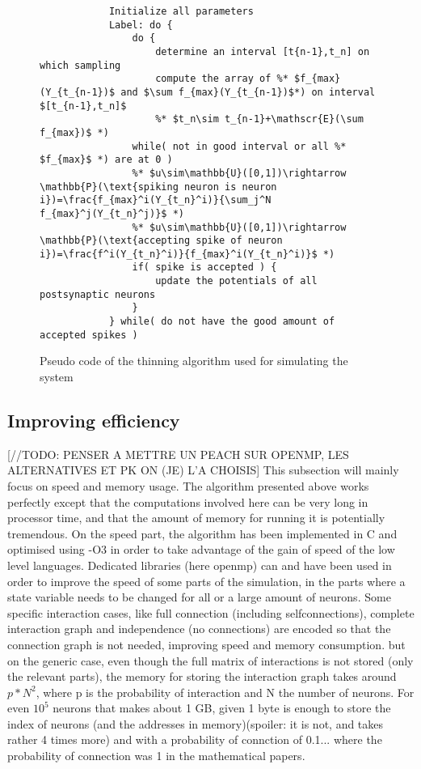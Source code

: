 	\begin{figure}
		\begin{lstlisting}
			Initialize all parameters
			Label: do {
				do {
					determine an interval [t{n-1},t_n] on which sampling
					compute the array of %* $f_{max}(Y_{t_{n-1})$ and $\sum f_{max}(Y_{t_{n-1})$*) on interval $[t_{n-1},t_n]$
					%* $t_n\sim t_{n-1}+\mathscr{E}(\sum f_{max})$ *)
				while( not in good interval or all %* $f_{max}$ *) are at 0 )
				%* $u\sim\mathbb{U}([0,1])\rightarrow \mathbb{P}(\text{spiking neuron is neuron i})=\frac{f_{max}^i(Y_{t_n}^i)}{\sum_j^N f_{max}^j(Y_{t_n}^j)}$ *)
				%* $u\sim\mathbb{U}([0,1])\rightarrow \mathbb{P}(\text{accepting spike of neuron i})=\frac{f^i(Y_{t_n}^i)}{f_{max}^i(Y_{t_n}^i)}$ *)
				if( spike is accepted ) {
					update the potentials of all postsynaptic neurons
				}
			} while( do not have the good amount of accepted spikes )
		\end{lstlisting}
		\caption{Pseudo code of the thinning algorithm used for simulating the system}
		\label{alg:pseudo-code}
	\end{figure}

\subsection{Improving efficiency}
	[//TODO: PENSER A METTRE UN PEACH SUR OPENMP, LES ALTERNATIVES ET PK ON (JE) L'A CHOISIS]
	This subsection will mainly focus on speed and memory usage. The algorithm presented above works perfectly except that the computations involved here can be very long in processor time, and that the amount of memory for running it is potentially tremendous. On the speed part, the algorithm has been implemented in C and optimised using -O3 in order to take advantage of the gain of speed of the low level languages. Dedicated libraries (here openmp) can and have been used in order to improve the speed of some parts of the simulation, in the parts where a state variable needs to be changed for all or a large amount of neurons.
	Some specific interaction cases, like full connection (including selfconnections), complete interaction graph and independence (no connections) are encoded so that the connection graph is not needed, improving speed and memory consumption. but on the generic case, even though the full matrix of interactions is not stored (only the relevant parts), the memory for storing the interaction graph takes around $p*N^2$, where p is the probability of interaction and N the number of neurons. For even $10^5$ neurons that makes about 1 GB, given 1 byte is enough to store the index of neurons (and the addresses in memory)(spoiler: it is not, and takes rather 4 times more) and with a probability of connction of 0.1... where the probability of connection was 1 in the mathematical papers.\\

